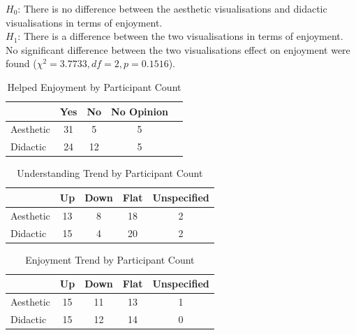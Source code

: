 \documentclass{article}
\begin{document}
$H_0$: There is no difference between the aesthetic visualisations and didactic visualisations in terms of enjoyment.\\
$H_1$: There is a difference between the two visualisations in terms of enjoyment.\\

No significant difference between the two visualisations effect on enjoyment were found ($\chi^2=3.7733,df=2,p=0.1516$).

\begin{table}
\caption {Helped Enjoyment by Participant Count} \label{tab:helpenjoy} 
\begin{center}
\begin{tabular}{ l | c c c c }

&Yes&No&No Opinion\\
\hline
Aesthetic&31&5&5 \\
Didactic&24&12&5 \\
\end{tabular}
\end{center}
\end{table}




\begin{table}
\caption {Understanding Trend by Participant Count} \label{tab:understandtrend} 
\begin{center}
\begin{tabular}{ l | c c c c }

&Up&Down&Flat&Unspecified\\
\hline
Aesthetic&13&8&18&2 \\
Didactic&15&4&20&2 \\
\end{tabular}
\end{center}
\end{table}


\begin{table}
\caption {Enjoyment Trend by Participant Count} \label{tab:enjoytrend} 
\begin{center}
\begin{tabular}{ l | c c c c }

&Up&Down&Flat&Unspecified\\
\hline
Aesthetic&15&11&13&1 \\
Didactic&15&12&14&0 \\
\end{tabular}
\end{center}
\end{table}
\end{document}
